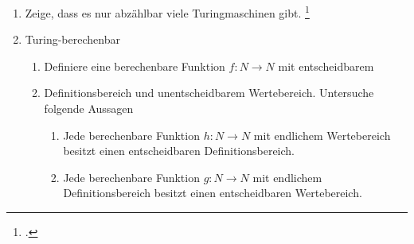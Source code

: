 \documentclass{bschlangaul-aufgabe}
\begin{document}

\begin{enumerate}
\item Zeige, dass es nur abzählbar viele Turingmaschinen gibt.
\footcite[Seite 29]{theo:fs:4}

\item Turing-berechenbar

\begin{enumerate}
\item Definiere eine berechenbare Funktion $f: N \rightarrow N$ mit
entscheidbarem

\item Definitionsbereich und unentscheidbarem Wertebereich. Untersuche
folgende Aussagen

\begin{enumerate}

\item Jede berechenbare Funktion $h: N \rightarrow N$ mit endlichem
Wertebereich besitzt einen entscheidbaren Definitionsbereich.

\item Jede berechenbare Funktion $g: N \rightarrow N$ mit endlichem
Definitionsbereich besitzt einen entscheidbaren Wertebereich.
\end{enumerate}
\end{enumerate}
\end{enumerate}
\end{document}
